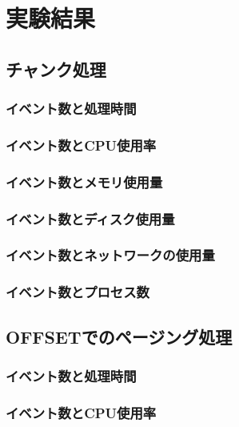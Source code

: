 \documentclass[../../main]{subfiles}
\begin{document}
    \section{実験結果}\label{sec:result}
    
    

    \subsection{チャンク処理}\label{subsec:result-chunk}
    \subsubsection{イベント数と処理時間}\label{subsubsec:result-chunk-time}
    \subsubsection{イベント数とCPU使用率}\label{subsubsec:result-chunk-cpu}
    \subsubsection{イベント数とメモリ使用量}\label{subsubsec:result-chunk-memory}
    \subsubsection{イベント数とディスク使用量}\label{subsubsec:result-chunk-disk}
    \subsubsection{イベント数とネットワークの使用量}\label{subsubsec:result-chunk-network}
    \subsubsection{イベント数とプロセス数}\label{subsubsec:result-chunk-process}

    \subsection{OFFSETでのページング処理}\label{subsec:result-paging-offset}
    \subsubsection{イベント数と処理時間}\label{subsubsec:result-paging-offset-time}
    \subsubsection{イベント数とCPU使用率}\label{subsubsec:result-paging-offset-cpu}
\end{document}
